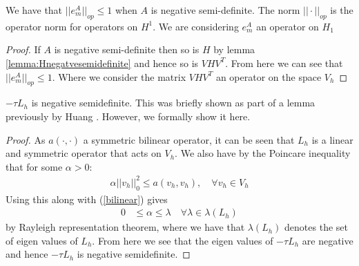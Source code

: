 \begin{lemma} \label{lemma:leqm}
    We have that $||e_m^A||_{op} \leq 1$ when $A$ is negative semi-definite.
    The norm $||\cdot||_{op}$ is the operator norm for operators on $H^1$.
    We are considering $e_m^A$ an operator on $H_1$
\end{lemma}
\begin{proof}
    If $A$ is negative semi-definite then so is $H$ by lemma \ref{lemma:Hnegatvesemidefinite} and hence so is $VHV^T$.
    From here we can see that $||e_m^A||_{op} \leq 1$.
    Where we consider the matrix $VHV^T$ an operator on the space $V_h$
\end{proof}

\begin{lemma} \label{lemma:LHnegativeSD}
    $-\tau L_h$ is negative semidefinite. 
    This was briefly shown as part of a lemma previously by Huang \cite{Huang2022}. However, we formally show it here.
\end{lemma}    
\begin{proof}
    As $a(\cdot,\cdot)$ a symmetric bilinear operator, it can be seen that $L_h$ is a linear and symmetric operator that acts on $V_h$.
    We also have by the Poincare inequality that for some $\alpha > 0$:
    \begin{align*}
        \alpha ||v_h||^2_0 \leq a(v_h, v_h), \quad \forall v_h \in V_h
    \end{align*}
    Using this along with (\ref{bilinear}) gives
    \begin{align*}
        0 &\leq \alpha \leq \lambda \quad \forall \lambda \in \lambda(L_h)
    \end{align*} %
    by Rayleigh representation theorem, where we have that $\lambda(L_h)$ denotes the set of eigen values of $L_h$.
    From here we see that the eigen values of $-\tau L_h$ are negative and hence $-\tau L_h$ is negative semidefinite.
\end{proof}

